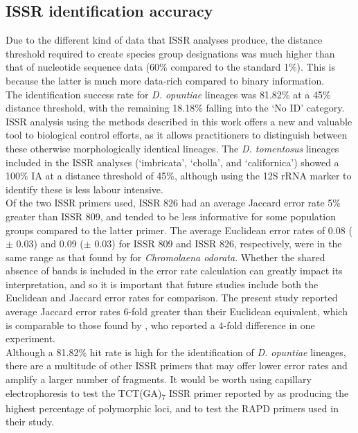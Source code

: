 \subsection{ISSR identification accuracy}
Due to the different kind of data that ISSR analyses produce, the distance threshold required to create species group designations was much higher than that of nucleotide sequence data (60\% compared to the standard 1\%). This is because the latter is much more data-rich compared to binary information. \\
The identification success rate for \textit{D. opuntiae} lineages was 81.82\% at a 45\% distance threshold, with the remaining 18.18\% falling into the `No ID' category.  ISSR analysis using the methods described in this work offers a new and valuable tool to biological control efforts, as it allows practitioners to distinguish between these otherwise morphologically identical lineages. The \textit{D. tomentosus} lineages included in the ISSR analyses (`imbricata', `cholla', and `californica') showed a 100\% IA at a distance threshold of 45\%, although using the 12S rRNA marker to identify these is less labour intensive. \\
Of the two ISSR primers used, ISSR 826 had an average Jaccard error rate 5\% greater than ISSR 809, and tended to be less informative for some population groups compared to the latter primer. The average Euclidean error rates of 0.08 ($\pm$ 0.03) and 0.09 ($\pm$ 0.03) for ISSR 809 and ISSR 826, respectively, were in the same range as that found by \citet{paterson2013issrs} for \textit{Chromolaena odorata}. Whether the shared absence of bands is included in the error rate calculation can greatly impact its interpretation, and so it is important that future studies include both the Euclidean and Jaccard error rates for comparison. The present study reported average Jaccard error rates 6-fold greater than their Euclidean equivalent, which is comparable to those found by \citet{holland2008optimizing}, who reported a 4-fold difference in one experiment. \\
Although a 81.82\% hit rate is high for the identification of \textit{D. opuntiae} lineages, there are a multitude of other ISSR primers that may offer lower error rates and amplify a larger number of fragments. It would be worth using capillary electrophoresis to test the TCT(GA)\textsubscript{7} ISSR primer reported by \citet{silva2013genetic} as producing the highest percentage of polymorphic loci, and to test the RAPD primers used in their study.

